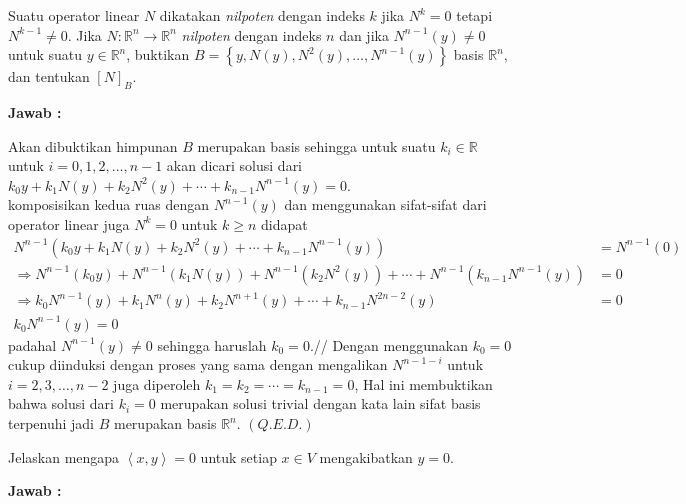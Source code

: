 \documentclass[11pt,a4paper]{article}
\theoremstyle{plain}
\theoremstyle{definition}
\theoremstyle{remark}
\begin{document}
\begin{enumerate}
\begin{enumerate}
		
		\textbf{Jawab :}
		
		Akan dibuktikan himpunan $B$ merupakan basis sehingga untuk suatu $k_{i}\in \mathbb{R}$ untuk $i=0,1,2,\ldots,n-1$ akan dicari solusi dari $k_{0}y+k_{1}N(y)+k_{2}N^{2}(y)+\cdots+k_{n-1}N^{n-1}(y)=0$.\\
		komposisikan kedua ruas dengan $N^{n-1}(y)$ dan menggunakan sifat-sifat dari operator linear juga $N^{k}=0$ untuk $k\geq n$ didapat
		\begin{align*}
		N^{n-1}(k_{0}y+k_{1}N(y)+k_{2}N^{2}(y)+\cdots+k_{n-1}N^{n-1}(y)) &= N^{n-1}(0) \\
		\Rightarrow N^{n-1}(k_{0}y)+N^{n-1}(k_{1}N(y))+N^{n-1}(k_{2}N^{2}(y))+\cdots+N^{n-1}(k_{n-1}N^{n-1}(y)) &=0 \\
		\Rightarrow k_{0}N^{n-1}(y)+k_{1}N^{n}(y)+k_{2}N^{n+1}(y)+\cdots+k_{n-1}N^{2n-2}(y)&= 0 \\
		k_{0} N^{n-1}(y) = 0
		\end{align*}
		padahal $N^{n-1}(y)\ne 0$ sehingga haruslah $k_{0}=0$.//
		Dengan menggunakan $k_{0}=0$ cukup diinduksi dengan proses yang sama dengan mengalikan $N^{n-1-i}$ untuk $i=2,3,\ldots,n-2$ juga diperoleh $k_{1}=k_{2}=\cdots=k_{n-1}=0$, Hal ini membuktikan bahwa solusi dari $k_{i}=0$ merupakan solusi trivial dengan kata lain sifat basis terpenuhi jadi $B$ merupakan basis $\mathbb{R}^{n}$. $(Q.E.D.)$

		
		\textbf{Jawab :}
		

\end{enumerate}
\end{enumerate}
\end{document}
